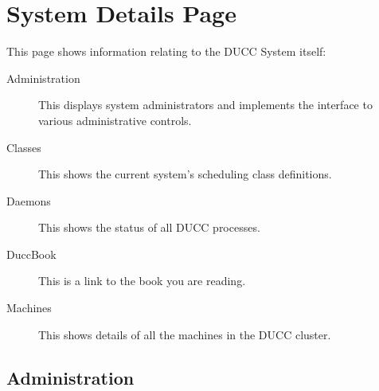 % 
% 
% 
% 

\section{System  Details Page}
\label{sec:system-details}

This page shows information relating to the DUCC System itself:
\begin{description}
  \item[Administration]This displays system administrators and implements
    the interface to various administrative controls.
  \item[Classes] This shows the current system's scheduling class definitions.
  \item[Daemons] This shows the status of all DUCC processes.
  \item[DuccBook] This is a link to the book you are reading.
  \item[Machines] This shows details of all the machines in the DUCC cluster.
\end{description}

\subsection{Administration}

